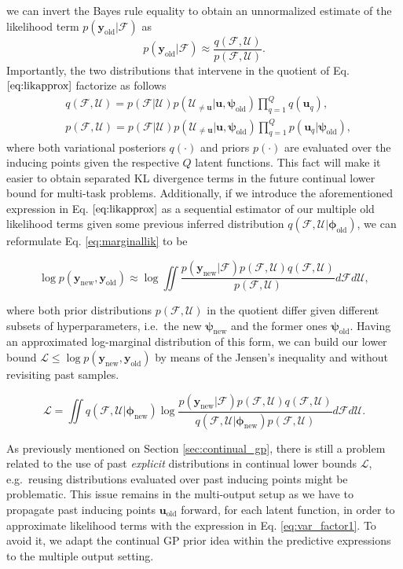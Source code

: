 \documentclass[]{article}
\def\u{{\mathbf u}}
\newcommand{\psiold}{{\bm{\psi}_{\text{old}}}}
\newcommand{\psinew}{{\bm{\psi}_{\text{new}}}}
\newcommand{\uold}{{\u_{\text{old}}}}
\newcommand{\Fcal}{\mathcal{F}}
\newcommand{\Ucal}{\mathcal{U}}
\newcommand{\Lcal}{\mathcal{L}}
\newcommand{\yc}{\bm{y}}
\newcommand{\ycnew}{{\yc_{\text{new}}}}
\newcommand{\ycold}{{\yc_{\text{old}}}}
\newcommand{\phiold}{{\bm{\phi}_{\text{old}}}}
\newcommand{\phinew}{{\bm{\phi}_{\text{new}}}}
\begin{document}
we can invert the Bayes rule equality to obtain an unnormalized estimate of the likelihood term $p(\ycold|\Fcal)$ as
\begin{equation}
\label{eq:likapprox}
p(\ycold|\Fcal) \approx \frac{q(\Fcal, \Ucal)}{p(\Fcal, \Ucal)}.
\end{equation}
Importantly, the two distributions that intervene in the quotient of Eq. $\eqref{eq:likapprox}$ factorize as follows
\begin{align}
&q(\Fcal, \Ucal) = p(\Fcal|\Ucal)p(\Ucal_{\neq \u}|\u, \psiold)\prod_{q=1}^{Q}q(\u_q), \label{eq:var_factor1}\\
&p(\Fcal, \Ucal) = p(\Fcal|\Ucal)p(\Ucal_{\neq \u}|\u, \psiold)\prod_{q=1}^{Q}p(\u_q|\psiold),
\end{align}
where both variational posteriors $q(\cdot)$ and priors $p(\cdot)$ are evaluated over the inducing points given the respective $Q$ latent functions. This fact will make it easier to obtain separated KL divergence terms in the future continual lower bound for multi-task problems. Additionally, if we introduce the aforementioned expression in Eq. $\eqref{eq:likapprox}$ as a sequential estimator of our multiple old likelihood terms given some previous inferred distribution $q(\Fcal, \Ucal|\phiold)$, we can reformulate Eq. \eqref{eq:marginallik} to be

\begin{equation}
\label{eq:approx_marginal}
\log p(\ycnew, \ycold)  \approx \log \iint \frac{p(\ycnew|\Fcal)p(\Fcal, \Ucal)q(\Fcal, \Ucal)}{p(\Fcal, \Ucal)}d\Fcal d\Ucal,
\end{equation}

where both prior distributions $p(\Fcal, \Ucal)$ in the quotient differ given different subsets of hyperparameters, i.e.\ the new $\psinew$ and the former ones $\psiold$. Having an approximated log-marginal distribution of this form, we can build our lower bound $\Lcal \leq \log p(\ycnew, \ycold)$ by means of the Jensen's inequality and without revisiting past samples.

\begin{equation}
\label{eq:approx_marginal}
 \Lcal =  \iint q(\Fcal, \Ucal|\phinew)\log \frac{p(\ycnew|\Fcal)p(\Fcal, \Ucal)q(\Fcal, \Ucal)}{q(\Fcal, \Ucal|\phinew)p(\Fcal, \Ucal)}d\Fcal d\Ucal.
\end{equation}

As previously mentioned on Section \ref{sec:continual_gp}, there is still a problem related to the use of past \emph{explicit} distributions in continual lower bounds $\Lcal$, e.g.\ reusing distributions evaluated over past inducing points might be problematic. This issue remains in the multi-output setup as we have to propagate past inducing points $\uold$ forward, for each latent function, in order to approximate likelihood terms with the expression in Eq. \eqref{eq:var_factor1}. To avoid it, we adapt the continual GP prior idea within the predictive expressions to the multiple output setting.
\end{document}
